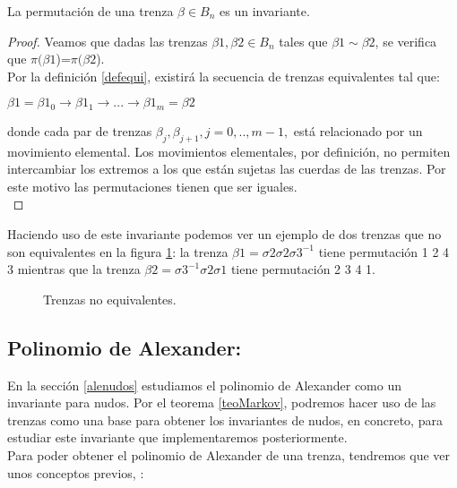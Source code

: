\begin{pro}
    La permutación de una trenza $\beta \in B_{n}$ es un invariante. 
    \begin{proof}
    	Veamos que dadas las trenzas $\beta1,\beta2 \in B_{n}$ tales que $\beta1 \sim \beta2$, se verifica que $\pi(\beta1$)=$\pi(\beta2$).\\
    	
    	Por la definición \ref{defequi}, existirá la secuencia de trenzas equivalentes tal que: 
    	\begin{center}
    		$ \beta1 = \beta1_{0} \rightarrow \beta1_{1} \rightarrow ... \rightarrow \beta1_{m}=\beta2$ 
    	\end{center}
    	donde cada par de trenzas $ \beta_{j}, \beta_{j+1}, j=0,..,m-1, $ está relacionado por un movimiento elemental. Los movimientos elementales, por definición, no permiten intercambiar los extremos a los que están sujetas las cuerdas de las trenzas. Por este motivo las permutaciones tienen que ser iguales. \\
    \end{proof}
\end{pro}

Haciendo uso de este invariante podemos ver un ejemplo de dos trenzas que no son equivalentes en la figura \ref{perm2}: la trenza $\beta1 = \sigma2\sigma2\sigma3^{-1}$ tiene permutación 1 2 4 3 mientras que la trenza $\beta2 = \sigma3^{-1}\sigma2\sigma1$ tiene permutación 2 3 4 1.\\ 
	\begin{figure}[h!]
		\centering
		\caption{Trenzas no equivalentes.}
		\label{perm2} 
	\end{figure}


\bigskip
\subsection{Polinomio de Alexander:}\label{invtren3}
En la sección \ref{alenudos} estudiamos el polinomio de Alexander como un invariante para nudos. Por el teorema \ref{teoMarkov}, podremos hacer uso de las trenzas como una base para obtener los invariantes de nudos, en concreto, para estudiar este invariante que implementaremos posteriormente. \\

Para poder obtener el polinomio de Alexander de una trenza, tendremos que ver unos conceptos previos, \cite{3}:

